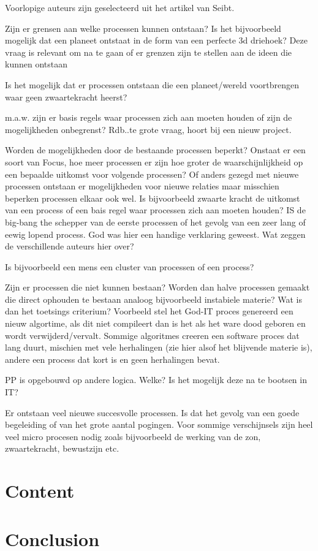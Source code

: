 \documentclass[a4paper]{Thesis}
\begin{document}
Voorlopige auteurs zijn geselecteerd uit het artikel van Seibt.

Zijn er grensen aan welke processen kunnen ontstaan? Is het bijvoorbeeld mogelijk dat een planeet ontstaat in de form van een perfecte 3d driehoek?
Deze vraag is relevant om na te gaan of er grenzen zijn te stellen aan de ideen die kunnen ontstaan

Is het mogelijk dat er processen ontstaan die een planeet/wereld voortbrengen waar geen zwaartekracht heerst?

m.a.w. zijn er basis regels waar processen zich aan moeten houden of zijn de mogelijkheden onbegrenst? 
Rdb..te grote vraag, hoort bij een nieuw project.

Worden de mogelijkheden door de bestaande processen beperkt? Onstaat er een soort van Focus, hoe meer processen er zijn hoe groter de waarschijnlijkheid op een bepaalde uitkomst voor volgende processen? Of anders gezegd met nieuwe processen ontstaan er mogelijkheden voor nieuwe relaties maar misschien beperken processen elkaar ook wel.
Is bijvoorbeeld zwaarte kracht de uitkomst van een process of een bais regel waar processen zich aan moeten houden?
IS de big-bang the schepper van de eerste processen of het gevolg van een zeer lang of eewig lopend process. God was hier een handige verklaring geweest.
Wat zeggen de verschillende auteurs hier over?

Is bijvoorbeeld een mens een cluster van processen of een process?

Zijn er processen die niet kunnen bestaan? Worden dan halve processen gemaakt die direct ophouden te bestaan analoog bijvoorbeeld instabiele materie?
Wat is dan het toetsings criterium? Voorbeeld stel het God-IT proces genereerd een nieuw algortime, als dit niet compileert dan is het als het ware dood geboren en wordt verwijderd/vervalt. Sommige algoritmes creeren een software proces dat lang duurt, mischien met vele herhalingen (zie hier alsof het blijvende materie is), andere een process dat kort is en geen herhalingen bevat.

PP is opgebouwd op andere logica. Welke? Is het mogelijk deze na te bootsen in IT?

Er ontstaan veel nieuwe succesvolle processen. Is dat het gevolg van een goede begeleiding of van het grote aantal pogingen. Voor sommige verschijnsels zijn heel veel micro procesen nodig zoals bijvoorbeeld de werking van de zon, zwaartekracht, bewustzijn etc.


\section{Content}
\section{Conclusion}

\end{document}
